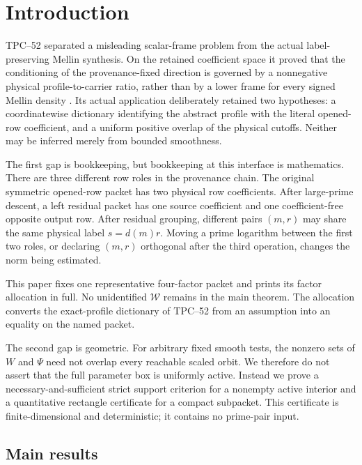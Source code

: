 \section{Introduction}
\label{sec:tpc53-introduction}

TPC--52 separated a misleading scalar-frame problem from the actual
label-preserving Mellin synthesis.  On the retained coefficient space it
proved that the conditioning of the provenance-fixed direction is
governed by a nonnegative physical profile-to-carrier ratio, rather than
by a lower frame for every signed Mellin density
\citep{WangTPC52}.  Its actual application deliberately retained two
hypotheses: a coordinatewise dictionary identifying the abstract profile
with the literal opened-row coefficient, and a uniform positive overlap
of the physical cutoffs.  Neither may be inferred merely from bounded
smoothness.

The first gap is bookkeeping, but bookkeeping at this interface is
mathematics.  There are three different row roles in the provenance
chain.  The original symmetric opened-row packet has two physical row
coefficients.  After large-prime descent, a left residual packet has one
source coefficient and one coefficient-free opposite output row.  After
residual grouping, different pairs \((m,r)\) may share the same physical
label \(s=d(m)r\).  Moving a prime logarithm between the first two roles,
or declaring \((m,r)\) orthogonal after the third operation, changes the
norm being estimated.

This paper fixes one representative four-factor packet and prints its
factor allocation in full.  No unidentified \(\mathcal W\) remains in
the main theorem.  The allocation converts the exact-profile dictionary
of TPC--52 from an assumption into an equality on the named packet.

The second gap is geometric.  For arbitrary fixed smooth tests, the
nonzero sets of \(W\) and \(\Psi\) need not overlap every reachable
scaled orbit.  We therefore do not assert that the full parameter box is
uniformly active.  Instead we prove a necessary-and-sufficient strict
support criterion for a nonempty active interior and a quantitative
rectangle certificate for a compact subpacket.  This certificate is
finite-dimensional and deterministic; it contains no prime-pair input.

\subsection{Main results}

